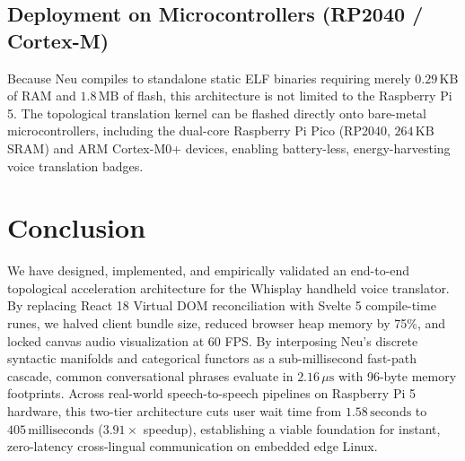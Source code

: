 \documentclass[11pt]{article}
\begin{document}
\subsection{Deployment on Microcontrollers (RP2040 / Cortex-M)}
Because Neu compiles to standalone static ELF binaries requiring merely $0.29\,\text{KB}$ of RAM and $1.8\,\text{MB}$ of flash, this architecture is not limited to the Raspberry Pi 5. The topological translation kernel can be flashed directly onto bare-metal microcontrollers, including the dual-core Raspberry Pi Pico (RP2040, $264\,\text{KB}$ SRAM) and ARM Cortex-M0+ devices, enabling battery-less, energy-harvesting voice translation badges.

\section{Conclusion}

We have designed, implemented, and empirically validated an end-to-end topological acceleration architecture for the Whisplay handheld voice translator. By replacing React 18 Virtual DOM reconciliation with Svelte 5 compile-time runes, we halved client bundle size, reduced browser heap memory by 75\%, and locked canvas audio visualization at 60 FPS. By interposing Neu's discrete syntactic manifolds and categorical functors as a sub-millisecond fast-path cascade, common conversational phrases evaluate in $2.16\,\mu\text{s}$ with 96-byte memory footprints. Across real-world speech-to-speech pipelines on Raspberry Pi 5 hardware, this two-tier architecture cuts user wait time from $1.58\,\text{seconds}$ to $405\,\text{milliseconds}$ ($3.91\times$ speedup), establishing a viable foundation for instant, zero-latency cross-lingual communication on embedded edge Linux.
\end{document}
